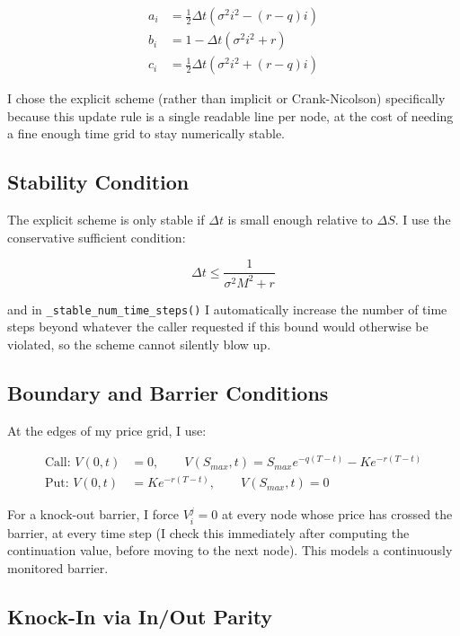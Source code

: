 \documentclass[12pt,a4paper]{article}
\begin{document}
\begin{align}
a_i &= \frac{1}{2}\Delta t\left(\sigma^2 i^2 - (r-q)i\right) \\
b_i &= 1 - \Delta t\left(\sigma^2 i^2 + r\right) \\
c_i &= \frac{1}{2}\Delta t\left(\sigma^2 i^2 + (r-q)i\right)
\end{align}

I chose the explicit scheme (rather than implicit or Crank-Nicolson)
specifically because this update rule is a single readable line per node,
at the cost of needing a fine enough time grid to stay numerically stable.

\subsection{Stability Condition}

The explicit scheme is only stable if $\Delta t$ is small enough relative
to $\Delta S$. I use the conservative sufficient condition:

\begin{equation}
\Delta t \le \frac{1}{\sigma^2 M^2 + r}
\end{equation}

and in \texttt{\_stable\_num\_time\_steps()} I automatically increase the
number of time steps beyond whatever the caller requested if this bound
would otherwise be violated, so the scheme cannot silently blow up.

\subsection{Boundary and Barrier Conditions}

At the edges of my price grid, I use:

\begin{align}
\text{Call: } V(0,t) &= 0, \qquad V(S_{max}, t) = S_{max}e^{-q(T-t)} - Ke^{-r(T-t)} \\
\text{Put: } V(0,t) &= Ke^{-r(T-t)}, \qquad V(S_{max}, t) = 0
\end{align}

For a knock-out barrier, I force $V_i^j = 0$ at every node whose price has
crossed the barrier, at every time step (I check this immediately after
computing the continuation value, before moving to the next node). This
models a continuously monitored barrier.

\subsection{Knock-In via In/Out Parity}
\end{document}
